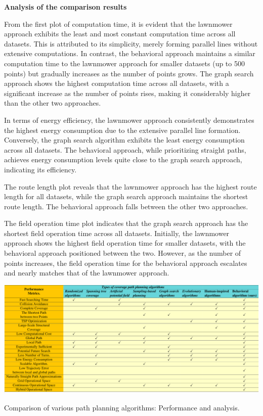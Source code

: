 \textbf{Analysis of the comparison results}  


\vspace*{6mm}


From the first plot of computation time, it is evident that the lawnmower approach exhibits the least and most constant computation time across all datasets. This is attributed to its simplicity, merely forming parallel lines without extensive computations. In contrast, the behavioral approach maintains a similar computation time to the lawnmower approach for smaller datasets (up to 500 points) but gradually increases as the number of points grows. The graph search approach shows the highest computation time across all datasets, with a significant increase as the number of points rises, making it considerably higher than the other two approaches.


\vspace*{6mm}


In terms of energy efficiency, the lawnmower approach consistently demonstrates the highest energy consumption due to the extensive parallel line formation. Conversely, the graph search algorithm exhibits the least energy consumption across all datasets. The behavioral approach, while prioritizing straight paths, achieves energy consumption levels quite close to the graph search approach, indicating its efficiency.


\vspace*{6mm}


The route length plot reveals that the lawnmower approach has the highest route length for all datasets, while the graph search approach maintains the shortest route length. The behavioral approach falls between the other two approaches.


\vspace*{6mm}


The field operation time plot indicates that the graph search approach has the shortest field operation time across all datasets. Initially, the lawnmower approach shows the highest field operation time for smaller datasets, with the behavioral approach positioned between the two. However, as the number of points increases, the field operation time for the behavioral approach escalates and nearly matches that of the lawnmower approach. 


\begin{table}[H]
    \centering
    \includegraphics[width=\textwidth]{Images/general/new_tick_table.png}
    \caption{Comparison of various path planning algorithms: Performance and analysis.}
    \label{tab:tick_table}
\end{table}

